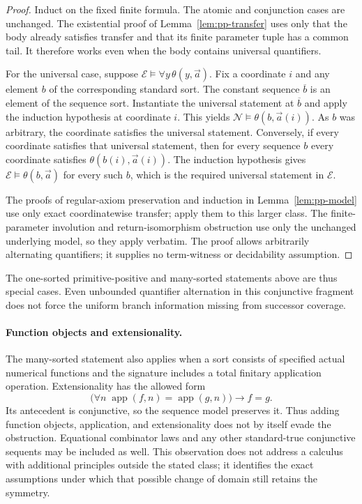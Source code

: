 \documentclass[11pt,letterpaper]{article}
\theoremstyle{definition}\newtheorem{definition}[theorem]{Definition}
\theoremstyle{remark}\newtheorem{remark}[theorem]{Remark}
\begin{document}
\begin{proof}
Induct on the fixed finite formula.  The atomic and conjunction cases
are unchanged.  The existential proof of
Lemma~\ref{lem:pp-transfer} uses only that the body already satisfies
transfer and that its finite parameter tuple has a common tail.
It therefore works even when the body contains universal quantifiers.

For the universal case, suppose
$\mathcal E\models\forall y\,\theta(y,\vec a)$.  Fix a
coordinate $i$ and any element $b$ of the corresponding standard sort.
The constant sequence $\overline b$ is an element of the sequence
sort.  Instantiate the universal statement at $\overline b$ and apply
the induction hypothesis at coordinate $i$.  This yields
$\mathcal N\models\theta(b,\vec a(i))$.  As $b$ was arbitrary,
the coordinate satisfies the universal statement.  Conversely, if
every coordinate satisfies that universal statement, then for every
sequence $b$ every coordinate satisfies $\theta(b(i),\vec a(i))$.
The induction hypothesis gives
$\mathcal E\models\theta(b,\vec a)$ for every such $b$,
which is the required universal statement in $\mathcal E$.

The proofs of regular-axiom preservation and induction in
Lemma~\ref{lem:pp-model} use only exact coordinatewise transfer;
apply them to this larger class.  The finite-parameter involution and
return-isomorphism obstruction use only the unchanged underlying model,
so they apply verbatim.  The proof allows arbitrarily alternating
quantifiers; it supplies no term-witness or decidability assumption.
\end{proof}

The one-sorted primitive-positive and many-sorted statements above are
thus special cases.  Even unbounded quantifier alternation in this
conjunctive fragment does not force the uniform branch information
missing from successor coverage.

\paragraph{Function objects and extensionality.}
The many-sorted statement also applies when a sort consists of specified
actual numerical functions and the signature includes a total finitary
application operation. Extensionality has the allowed form
\[
 \bigl(\forall n\;\operatorname{app}(f,n)=\operatorname{app}(g,n)\bigr)
       \to f=g.
\]
Its antecedent is conjunctive, so the sequence model preserves it.
Thus adding function objects, application, and extensionality does not
by itself evade the obstruction. Equational combinator laws and any
other standard-true conjunctive sequents may be included as well.
This observation does not address a calculus with additional principles
outside the stated class; it identifies the exact assumptions under
which that possible change of domain still retains the symmetry.
\end{document}
